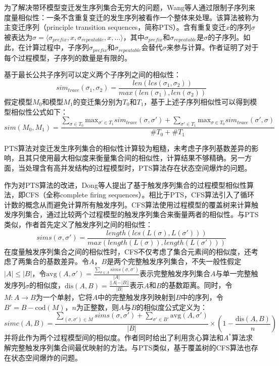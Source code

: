 为了解决带环模型变迁发生序列集合无穷大的问题，Wang等人通过限制子序列来度量相似性：一条不含重复变迁的发生序列被看作一个整体来处理\cite{wang2010behavioral}。该算法被称为主变迁序列（principle transition sequences，简称PTS）。含有重复变迁$x$的序列$\sigma$被表达为$\sigma=\langle\sigma_{prefix},x,\sigma_{repeatable},x,...\rangle$，其中$\sigma_{prefix}$和$\sigma_{repeatable}$是$\sigma$的子序列。如此，在计算过程中，子序列$\sigma_{prefix}$和$\sigma_{repeatable}$会替代$\sigma$来参与计算。作者证明了对于每个过程模型，子序列的数量是有限的。

基于最长公共子序列可以定义两个子序列之间的相似性：
\begin{displaymath}
  sim_{trace}(\sigma_{1},\sigma_{2})=\frac{len(lcs(\sigma_{1},\sigma_{2}))}{max(len(\sigma_{1}),len(\sigma_{2}))}
\end{displaymath}
假定模型$M_{0}$和模型$M_{1}$的变迁集分别为$T_{0}$和$T_{1}$，基于上述子序列相似性可以得到模型相似性公式如下：
\begin{displaymath}
  sim(M_{0},M_{1})=\frac{\sum_{\sigma\in T_{0}}\text{max}_{\sigma'\in T_{1}}sim_{trace}(\sigma,\sigma')+\sum_{\sigma'\in T_{1}}\text{max}_{\sigma\in T_{0}}sim_{trace}(\sigma',\sigma)}{\#T_{0}+\#T_{1}}
\end{displaymath}

PTS算法对变迁发生序列集合的相似性计算较为粗糙，未考虑子序列基数差异的影响，且其只使用最大相似度来衡量集合间的相似性，计算结果不够精确。另一方面，当处理含有高并发结构的过程模型时，PTS算法存在状态空间爆炸的问题。

作为对PTS算法的改进，Dong等人提出了基于触发序列集合的过程模型相似性算法，即CFS（全称complete firing sequences）\cite{dong2014cfs}。相比于PTS，CFS算法引入了循环计数的概念从而避免计算所有触发序列。CFS算法使用过程模型的覆盖树来计算触发序列集合，通过比较两个过程模型的触发序列集合来衡量两者的相似性。与PTS类似，作者首先定义了触发序列之间的相似性：
\begin{displaymath}
  sims(\sigma,\sigma')=\frac{length(lcs(L(\sigma),L(\sigma')))}{max(length(L(\sigma)),length(L(\sigma')))}
\end{displaymath}
在度量触发序列集合之间的相似性时，CFS不仅考虑了集合元素间的相似度，还考虑了两集合的基数差异。令$A$，$B$是两个完整触发序列集合，不失一般性假定$|A|\leq|B|$，令$\text{avg}(A,\sigma')=\frac{\sum_{\sigma\in A}sims(\sigma,\sigma')}{|A|}$表示完整触发序列集合$A$与单一完整触发序列$\sigma$的相似度，$\text{dis}(A,B)=\frac{||A|-|B||}{|B|}$表示$A$和$B$的基数距离。同时，令$M:A\rightarrow B$为一个单射，它将$A$中的完整触发序列映射到$B$中的序列，令$B'=B-\text{cod}(M)$，$n$为正整数，则$A$与$B$的相似度公式定义为：
\begin{displaymath}
  simc(A,B)=\frac{\sum_{(\sigma,\sigma')\in M}sims(\sigma,\sigma')+\sum_{\sigma'\in B'}\text{avg}(A,\sigma')}{|B|}\times(1-\frac{\text{dis}(A,B)}{n})
\end{displaymath}
并将此作为两个过程模型间的相似度。作者同时给出了利用贪心算法和$A^{*}$算法求解完整触发序列集合间最优映射的方法。与PTS类似，基于覆盖树的CFS算法也存在状态空间爆炸的问题。

